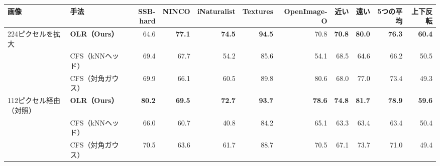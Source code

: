 \documentclass[border=3pt]{standalone}
\newcommand{\B}[1]{\textcolor{tnavy}{\textbf{#1}}}
\begin{document}
%
\begin{tabular}{ll*{5}{r}rrrr}%
\toprule
画像 & 手法 & SSB-hard & NINCO & iNaturalist & Textures & OpenImage-O & 近い & 遠い & 5つの平均 & 上下反転\\
\midrule
224ピクセルを拡大 & \textbf{OLR（Ours）} & 64.6 & \B{77.1} & \B{74.5} & \B{94.5} & 70.8 & \B{70.8} & \B{80.0} & \B{76.3} & \B{60.4}\\
 & CFS（kNNヘッド） & 69.4 & 67.7 & 54.2 & 85.6 & 54.1 & 68.5 & 64.6 & 66.2 & 50.5\\
 & CFS（対角ガウス） & 69.9 & 66.1 & 60.5 & 89.8 & 80.6 & 68.0 & 77.0 & 73.4 & 49.3\\
\midrule
112ピクセル経由（対照） & \textbf{OLR（Ours）} & \B{80.2} & \B{69.5} & \B{72.7} & \B{93.7} & \B{78.6} & \B{74.8} & \B{81.7} & \B{78.9} & \B{59.6}\\
 & CFS（kNNヘッド） & 66.0 & 60.7 & 40.8 & 84.2 & 65.1 & 63.3 & 63.4 & 63.4 & 50.4\\
 & CFS（対角ガウス） & 70.5 & 63.6 & 61.7 & 88.7 & 70.5 & 67.1 & 73.7 & 71.0 & 49.4\\
\bottomrule
\end{tabular}%
\end{document}
